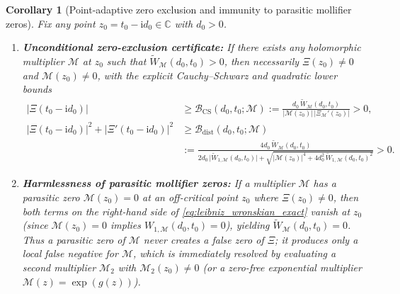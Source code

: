 \documentclass[11pt,reqno,a4paper]{amsart}
\theoremstyle{plain}
\newtheorem{corollary}[theorem]{Corollary}
\theoremstyle{definition}
\theoremstyle{remark}
\numberwithin{equation}{section}
\newcommand{\ii}{\mathrm{i}}
\begin{document}
\begin{corollary}[Point-adaptive zero exclusion and immunity to parasitic mollifier zeros]\label{cor:zero_exclusion}
Fix any point $z_0 = t_0 - \ii d_0 \in \mathbb{C}$ with $d_0 > 0$.
\begin{enumerate}[label=\textup{(\arabic*)},leftmargin=2.2em]
  \item \textbf{Unconditional zero-exclusion certificate:} If there exists \emph{any} holomorphic multiplier $\mathcal{M}$ at $z_0$ such that $\widetilde{W}_{\mathcal{M}}(d_0, t_0) > 0$, then necessarily $\Xi(z_0) \neq 0$ and $\mathcal{M}(z_0) \neq 0$, with the explicit Cauchy--Schwarz and quadratic lower bounds
  \begin{equation}\label{eq:B_dist_bound}
  \begin{aligned}
    \big|\Xi(t_0 - \ii d_0)\big|
    &\ge \mathcal{B}_{\mathrm{CS}}(d_0, t_0; \mathcal{M})
     := \frac{d_0\,\widetilde{W}_{\mathcal{M}}(d_0, t_0)}{\big|\mathcal{M}(z_0)\big|\,\big|\Xi_{\mathcal{M}}'(z_0)\big|} > 0, \\[4pt]
    \big|\Xi(t_0 - \ii d_0)\big|^2 + \big|\Xi'(t_0 - \ii d_0)\big|^2
    &\ge \mathcal{B}_{\mathrm{dist}}(d_0, t_0; \mathcal{M}) \\
    &:= \frac{4d_0\,\widetilde{W}_{\mathcal{M}}(d_0, t_0)}{2d_0\,\big|\widetilde{W}_{1,\mathcal{M}}(d_0, t_0)\big| + \sqrt{\big|\mathcal{M}(z_0)\big|^4 + 4d_0^2\,\widetilde{W}_{1,\mathcal{M}}(d_0, t_0)^2}} > 0.
  \end{aligned}
  \end{equation}
  \item \textbf{Harmlessness of parasitic mollifier zeros:} If a multiplier $\mathcal{M}$ has a parasitic zero $\mathcal{M}(z_0) = 0$ at an off-critical point $z_0$ where $\Xi(z_0) \neq 0$, then both terms on the right-hand side of \eqref{eq:leibniz_wronskian_exact} vanish at $z_0$ (since $\mathcal{M}(z_0) = 0$ implies $W_{1,\mathcal{M}}(d_0,t_0) = 0$), yielding $\widetilde{W}_{\mathcal{M}}(d_0, t_0) = 0$. Thus a parasitic zero of $\mathcal{M}$ never creates a false zero of $\Xi$; it produces only a local false negative for $\mathcal{M}$, which is immediately resolved by evaluating a second multiplier $\mathcal{M}_2$ with $\mathcal{M}_2(z_0) \neq 0$ (or a zero-free exponential multiplier $\mathcal{M}(z) = \exp(g(z))$).
\end{enumerate}
\end{corollary}
\end{document}
